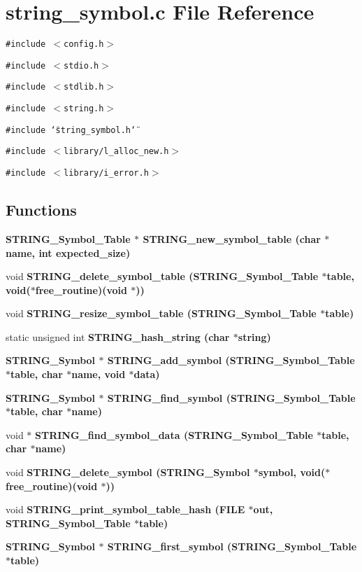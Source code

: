 \section{string\_\-symbol.c File Reference}
\label{string__symbol_8c}
{\tt \#include $<$config.h$>$}\par
{\tt \#include $<$stdio.h$>$}\par
{\tt \#include $<$stdlib.h$>$}\par
{\tt \#include $<$string.h$>$}\par
{\tt \#include \char`\"{}string\_\-symbol.h\char`\"{}}\par
{\tt \#include $<$library/l\_\-alloc\_\-new.h$>$}\par
{\tt \#include $<$library/i\_\-error.h$>$}\par
\subsection*{Functions}
\begin{CompactItemize}
\item 
\bf{STRING\_\-Symbol\_\-Table} $\ast$ \bf{STRING\_\-new\_\-symbol\_\-table} (char $\ast$\bf{name}, int expected\_\-size)
\item 
void \bf{STRING\_\-delete\_\-symbol\_\-table} (\bf{STRING\_\-Symbol\_\-Table} $\ast$table, void($\ast$free\_\-routine)(void $\ast$))
\item 
void \bf{STRING\_\-resize\_\-symbol\_\-table} (\bf{STRING\_\-Symbol\_\-Table} $\ast$table)
\item 
static unsigned int \bf{STRING\_\-hash\_\-string} (char $\ast$string)
\item 
\bf{STRING\_\-Symbol} $\ast$ \bf{STRING\_\-add\_\-symbol} (\bf{STRING\_\-Symbol\_\-Table} $\ast$table, char $\ast$\bf{name}, void $\ast$data)
\item 
\bf{STRING\_\-Symbol} $\ast$ \bf{STRING\_\-find\_\-symbol} (\bf{STRING\_\-Symbol\_\-Table} $\ast$table, char $\ast$\bf{name})
\item 
void $\ast$ \bf{STRING\_\-find\_\-symbol\_\-data} (\bf{STRING\_\-Symbol\_\-Table} $\ast$table, char $\ast$\bf{name})
\item 
void \bf{STRING\_\-delete\_\-symbol} (\bf{STRING\_\-Symbol} $\ast$symbol, void($\ast$free\_\-routine)(void $\ast$))
\item 
void \bf{STRING\_\-print\_\-symbol\_\-table\_\-hash} (FILE $\ast$out, \bf{STRING\_\-Symbol\_\-Table} $\ast$table)
\item 
\bf{STRING\_\-Symbol} $\ast$ \bf{STRING\_\-first\_\-symbol} (\bf{STRING\_\-Symbol\_\-Table} $\ast$table)
\end{CompactItemize}
